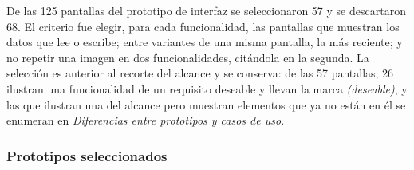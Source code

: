 De las 125 pantallas del prototipo de interfaz se seleccionaron 57 y se descartaron 68. El criterio fue elegir, para cada funcionalidad, las pantallas que muestran los datos que lee o escribe; entre variantes de una misma pantalla, la más reciente; y no repetir una imagen en dos funcionalidades, citándola en la segunda. La selección es anterior al recorte del alcance y se conserva: de las 57 pantallas, 26 ilustran una funcionalidad de un requisito deseable y llevan la marca \textit{(deseable)}, y las que ilustran una del alcance pero muestran elementos que ya no están en él se enumeran en \textit{Diferencias entre prototipos y casos de uso}.

\subsubsection*{Prototipos seleccionados}
